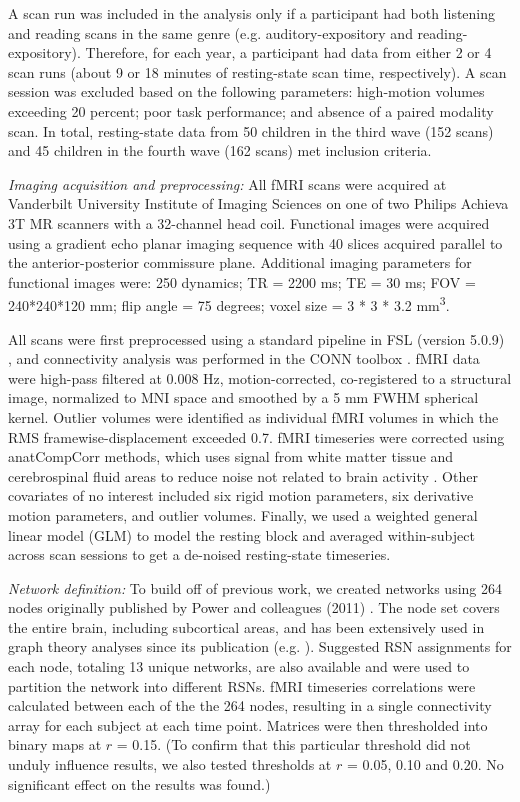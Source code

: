 A scan run was included in the analysis only if a participant had both listening and reading scans in the same genre (e.g. auditory-expository and reading-expository). Therefore, for each year, a participant had data from either 2 or 4 scan runs (about 9 or 18 minutes of resting-state scan time, respectively). A scan session was excluded based on the following parameters: high-motion volumes exceeding 20 percent; poor task performance; and absence of a paired modality scan. In total, resting-state data from 50 children in the third wave (152 scans) and 45 children in the fourth wave (162 scans) met inclusion criteria. 

\emph{Imaging acquisition and preprocessing: } All fMRI scans were acquired at Vanderbilt University Institute of Imaging Sciences on one of two Philips Achieva 3T MR scanners with a 32-channel head coil. Functional images were acquired using a gradient echo planar imaging sequence with 40 slices acquired parallel to the anterior-posterior commissure plane. Additional imaging parameters for functional images were: 250 dynamics; TR = 2200 ms; TE = 30 ms; FOV = 240*240*120 mm; flip angle = 75 degrees; voxel size = 3 * 3 * 3.2 mm\textsuperscript{3}.

All scans were first preprocessed using a standard pipeline in FSL (version 5.0.9) \citep{Jenkinson2012}, and connectivity analysis was performed in the CONN toolbox \citep{WhitfieldGabrieli2012}. fMRI data were high-pass filtered at 0.008 Hz, motion-corrected, co-registered to a structural image, normalized to MNI space and smoothed by a 5 mm FWHM spherical kernel. Outlier volumes were identified as individual fMRI volumes in which the RMS framewise-displacement exceeded 0.7. fMRI timeseries were corrected using anatCompCorr methods, which uses signal from white matter tissue and cerebrospinal fluid areas to reduce noise not related to brain activity \citep{Chai2012}. Other covariates of no interest included six rigid motion parameters, six derivative motion parameters, and outlier volumes. Finally, we used a weighted general linear model (GLM) to model the resting block and averaged within-subject across scan sessions to get a de-noised resting-state timeseries.

\emph{Network definition:} To build off of previous work, we created networks using 264 nodes originally published by Power and colleagues (2011) \citep{Power2011}. The node set covers the entire brain, including subcortical areas, and has been extensively used in graph theory analyses since its publication (e.g. \citep{Cole2014, Godwin2015, Mattar2015}). Suggested RSN assignments for each node, totaling 13 unique networks, are also available and were used to partition the network into different RSNs. fMRI timeseries correlations were calculated between each of the the 264 nodes, resulting in a single connectivity array for each subject at each time point. Matrices were then thresholded into binary maps at $r$ = 0.15. (To confirm that this particular threshold did not unduly influence results, we also tested thresholds at $r$ = 0.05, 0.10 and 0.20. No significant effect on the results was found.)


